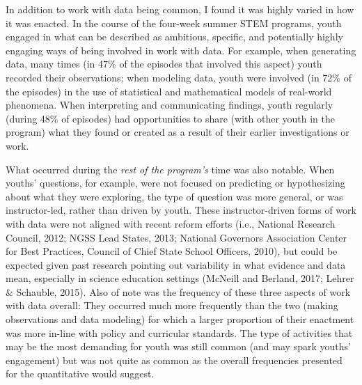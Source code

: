 \documentclass[]{book}
\theoremstyle{definition}
\theoremstyle{definition}
\theoremstyle{definition}
\theoremstyle{remark}
\begin{document}
In addition to work with data being common, I found it was highly varied
in how it was enacted. In the course of the four-week summer STEM
programs, youth engaged in what can be described as ambitious, specific,
and potentially highly engaging ways of being involved in work with
data. For example, when generating data, many times (in 47\% of the
episodes that involved this aspect) youth recorded their observations;
when modeling data, youth were involved (in 72\% of the episodes) in the
use of statistical and mathematical models of real-world phenomena. When
interpreting and communicating findings, youth regularly (during 48\% of
episodes) had opportunities to share (with other youth in the program)
what they found or created as a result of their earlier investigations
or work.

What occurred during the \emph{rest of the program's} time was also
notable. When youths' questions, for example, were not focused on
predicting or hypothesizing about what they were exploring, the type of
question was more general, or was instructor-led, rather than driven by
youth. These instructor-driven forms of work with data were not aligned
with recent reform efforts (i.e., National Research Council, 2012; NGSS
Lead States, 2013; National Governors Association Center for Best
Practices, Council of Chief State School Officers, 2010), but could be
expected given past research pointing out variability in what evidence
and data mean, especially in science education settings (McNeill and
Berland, 2017; Lehrer \& Schauble, 2015). Also of note was the frequency
of these three aspects of work with data overall: They occurred much
more frequently than the two (making observations and data modeling) for
which a larger proportion of their enactment was more in-line with
policy and curricular standards. The type of activities that may be the
most demanding for youth was still common (and may spark youths'
engagement) but was not quite as common as the overall frequencies
presented for the quantitative would suggest.
\end{document}

